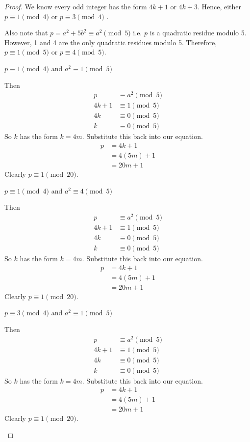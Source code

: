 \begin{proof}
We know every odd integer has the form $4k+1$ or $4k+3$. Hence, either
$p \equiv 1 \pmod 4$ or $p \equiv 3 \pmod 4$ .

Also note that $p = a^2 + 5b^2 \equiv a^2 \pmod 5$ i.e. $p$ is a quadratic
residue modulo 5. However, 1 and 4 are the only quadratic residues modulo 5.
Therefore, $p \equiv 1 \pmod 5$ or $p \equiv 4 \pmod 5$.

\begin{case}
$p \equiv 1 \pmod 4$ and $a^2 \equiv 1 \pmod 5$

Then
\begin{align*}
		  p &\equiv a^2 \pmod 5 \\
	 4k + 1 &\equiv 1 \pmod 5 \\
	     4k &\equiv 0 \pmod 5 \\
	      k &\equiv 0 \pmod 5
\end{align*}
So $k$ has the form $k=4m$. Substitute this back into our equation.
\begin{align*}
	p &= 4k + 1 \\
	  &= 4(5m) + 1 \\
	  &= 20m + 1
\end{align*}
Clearly $p \equiv 1 \pmod{20}$.
\end{case}

\begin{case}
$p \equiv 1 \pmod 4$ and $a^2 \equiv 4 \pmod 5$

Then
\begin{align*}
		  p &\equiv a^2 \pmod 5 \\
	 4k + 1 &\equiv 1 \pmod 5 \\
	     4k &\equiv 0 \pmod 5 \\
	      k &\equiv 0 \pmod 5
\end{align*}
So $k$ has the form $k=4m$. Substitute this back into our equation.
\begin{align*}
	p &= 4k + 1 \\
	  &= 4(5m) + 1 \\
	  &= 20m + 1
\end{align*}
Clearly $p \equiv 1 \pmod{20}$.
\end{case}

\begin{case}
$p \equiv 3 \pmod 4$ and $a^2 \equiv 1 \pmod 5$

Then
\begin{align*}
		  p &\equiv a^2 \pmod 5 \\
	 4k + 1 &\equiv 1 \pmod 5 \\
	     4k &\equiv 0 \pmod 5 \\
	      k &\equiv 0 \pmod 5
\end{align*}
So $k$ has the form $k=4m$. Substitute this back into our equation.
\begin{align*}
	p &= 4k + 1 \\
	  &= 4(5m) + 1 \\
	  &= 20m + 1
\end{align*}
Clearly $p \equiv 1 \pmod{20}$.
\end{case}


\end{proof}
